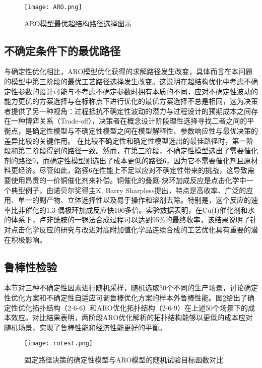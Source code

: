 \begin{figure}
  \centering
  \texttt{[image: ARO.png]}
  \caption{ARO模型最优超结构路径选择图示}
  \label{fig:rufiaro}
\end{figure}

\subsection{不确定条件下的最优路径}

与确定性优化相比，ARO模型优化获得的求解路径发生改变，具体而言在本问题的模型中第三阶段的最优工艺路径选择发生改变。这说明在超结构优化中考虑不确定性参数的设计可能与不考虑不确定参数时拥有本质的不同，应对不确定性波动的能力更优的方案选择与在标称点下进行优化的最优方案选择不总是相同，这为决策者提供了另一种视角：过程抵抗不确定性波动的潜力与过程设计的预期成本之间存在一种博弈关系（Trade-off），决策者在概念设计阶段理性选择寻找二者之间的平衡点，是确定性模型与不确定性模型之间在模型解释性、参数响应性与最优决策的差异比较的关键作用。
在比较不确定性和确定性模型选出的最佳路径时，第一阶段和第二阶段得到的路径一致。然而，在第三阶段，不确定性模型选出了需要催化剂的路径9，而确定性模型则选出了成本更低的路径6，因为它不需要催化剂且原材料更经济。尽管如此，路径6在性能上不足以应对不确定性带来的挑战，这导致需要使用昂贵的一价铜催化剂来补偿。铜催化的叠氮-炔环加成反应是点击化学中一个典型例子，由诺贝尔奖得主K. Barry Sharpless提出，特点是高收率、广泛的应用、单一的副产物、立体选择性以及易于操作和溶剂去除。特别是，这个反应的速率比非催化的1,3-偶极环加成反应快100多倍。实验数据表明，在Cu(I)催化剂和水的体系下，卢非酰胺的一锅法合成过程可以达到95\%的最终收率，该结果说明了针对点击化学反应的研究与改进对高附加值化学品连续合成的工艺优化具有重要的潜在积极影响。

\subsection{鲁棒性检验}

本节对三种不确定性因素进行随机采样，随机选取50个不同的生产场景，讨论确定性优化方案和不确定性自适应可调鲁棒优化方案的样本外鲁棒性能。图\ref{fig:rotest}给出了确定性优化拓扑结构（2-6-6）和ARO优化拓扑结构（2-6-9）在上述50个场景下的成本效应。对比结果表明，两阶段ARO优化解析的拓扑结构能够以更低的成本应对随机场景，实现了鲁棒性能和经济性能更好的平衡。

\begin{figure}
  \centering
  \texttt{[image: rotest.png]}
  \caption{固定路径决策的确定性模型与ARO模型的随机试验目标函数对比}
  \label{fig:rotest}
\end{figure}



